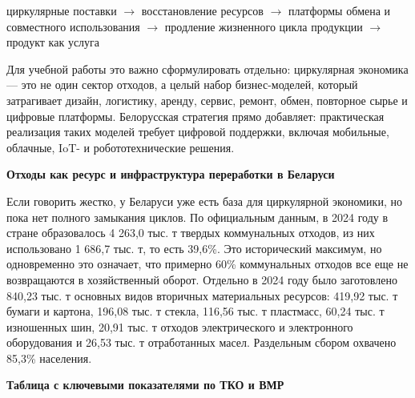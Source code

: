 \documentclass[14pt,a4paper]{extarticle}
\begin{document}
циркулярные поставки $\rightarrow$ восстановление ресурсов $\rightarrow$ платформы обмена и совместного использования $\rightarrow$ продление жизненного цикла продукции $\rightarrow$ продукт как услуга

Для учебной работы это важно сформулировать отдельно: циркулярная экономика --- это не один сектор отходов, а целый набор бизнес-моделей, который затрагивает дизайн, логистику, аренду, сервис, ремонт, обмен, повторное сырье и цифровые платформы. Белорусская стратегия прямо добавляет: практическая реализация таких моделей требует цифровой поддержки, включая мобильные, облачные, IoT- и робототехнические решения.

\textbf{Отходы как ресурс и инфраструктура переработки в Беларуси}

Если говорить жестко, у Беларуси уже есть база для циркулярной экономики, но пока нет полного замыкания циклов. По официальным данным, в 2024 году в стране образовалось 4 263,0 тыс. т твердых коммунальных отходов, из них использовано 1 686,7 тыс. т, то есть 39,6\%. Это исторический максимум, но одновременно это означает, что примерно 60\% коммунальных отходов все еще не возвращаются в хозяйственный оборот. Отдельно в 2024 году было заготовлено 840,23 тыс. т основных видов вторичных материальных ресурсов: 419,92 тыс. т бумаги и картона, 196,08 тыс. т стекла, 116,56 тыс. т пластмасс, 60,24 тыс. т изношенных шин, 20,91 тыс. т отходов электрического и электронного оборудования и 26,53 тыс. т отработанных масел. Раздельным сбором охвачено 85,3\% населения.

\textbf{Таблица с ключевыми показателями по ТКО и ВМР}
\end{document}
